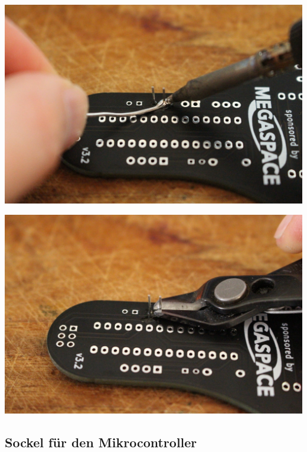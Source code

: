 \documentclass{article}
\begin{document}
\vspace{0.5cm}

\begin{minipage}[b]{0.5\textwidth}
	\includegraphics[width=\textwidth]{Bilder2022/IMG_8194.JPG}
\end{minipage}
\begin{minipage}[b]{0.5\textwidth}
	\includegraphics[width=\textwidth]{Bilder2022/IMG_8195.JPG}
\end{minipage}

\vspace{0.5cm}

\subsection{Sockel für den Mikrocontroller}
\end{document}
